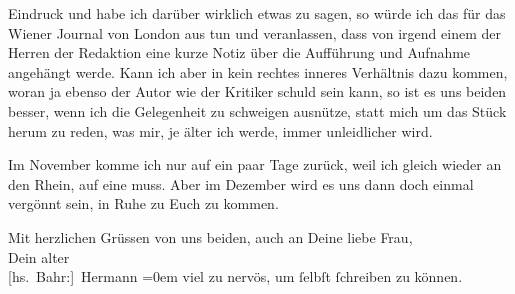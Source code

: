                Eindruck und habe ich darüber wirklich etwas zu sagen, so würde ich das für das Wiener Journal von London aus tun und veranlassen, dass von irgend einem der Herren {\pb}der Redaktion eine kurze Notiz über die Aufführung
               und Aufnahme angehängt werde. Kann ich aber in kein rechtes inneres Verhältnis dazu
               kommen, woran ja ebenso der Autor wie der Kritiker schuld sein kann, so ist es uns
               beiden besser, wenn ich die Gelegenheit zu schweigen ausnütze, statt mich um das
               Stück herum zu reden, was mir, je älter ich werde, immer unleidlicher wird.\pend
           
\pstart
           Im November komme ich nur auf ein paar Tage zurück, weil ich gleich
               wieder an den Rhein, auf eine \label{K_L01958-3v}\label{K_L01958-3} muss. Aber im
                  Dezember wird es uns dann doch einmal vergönnt sein, in Ruhe zu Euch zu kommen.\pend
           
\pstart
           {\pb}Mit herzlichen Grüssen von uns beiden, auch an Deine liebe Frau,{\\[\baselineskip]}Dein alter{\\[\baselineskip]}\spacefill\mbox{{[}hs. Bahr:{]} Hermann}\pend
           \leftskip=0em{}
\pstart
           \noindent{}viel zu nervös, um{ }ſelbſt{ }ſchreiben zu können.\pend
           \endnumbering{}  \newcommand{\dateiname}{L01958}\newcommand{\titel}{Hermann Bahr an Arthur Schnitzler, 26. 9. 1910}\newcommand{\editorInnen}{Herausgegeben von Martin Anton Müller}
